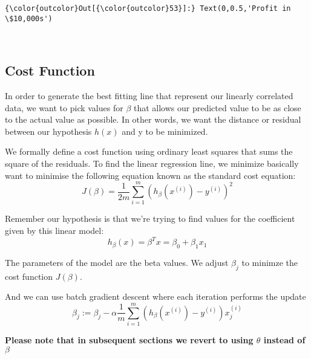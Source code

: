 \documentclass[11pt]{article}
\begin{document}
\begin{Verbatim}[commandchars=\\\{\}]
{\color{outcolor}Out[{\color{outcolor}53}]:} Text(0,0.5,'Profit in \$10,000s')
\end{Verbatim}
            
    \begin{center}
    \end{center}
    { \hspace*{\fill} \\}
    
    \subsection{Cost Function}\label{cost-function}

In order to generate the best fitting line that represent our linearly
correlated data, we want to pick values for \(\beta\) that allows our
predicted value to be as close to the actual value as possible. In other
words, we want the distance or residual between our hypothesis \(h(x)\)
and y to be minimized.

We formally define a cost function using ordinary least squares that
sums the square of the residuals. To find the linear regression line, we
minimize basically want to minimise the following equation known as the
standard cost equation:
\[J(\beta) = \frac{1}{2m}\sum_{i=1}^m(h_\beta(x^{(i)})-y^{(i)})^2\]

Remember our hypothesis is that we're trying to find values for the
coefficient given by this linear model:
\[h_\beta(x) = \beta^{T}x = \beta_0 + \beta_1x_1\]

The parameters of the model are the beta values. We adjust \(\beta_j\)
to minimze the cost function \(J(\beta)\).

And we can use batch gradient descent where each iteration performs the
update
\[\beta_j := \beta_j - \alpha\frac{1}{m}\sum_{i=1}^m (h_\beta(x^{(i)})-y^{(i)})x_{j}^{(i)}\]

\textbf{Please note that in subsequent sections we revert to using
\(\theta\) instead of \(\beta\)}
\end{document}
